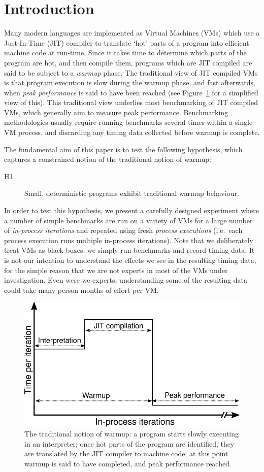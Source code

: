 \documentclass[preprint,numbers,10pt]{sigplanconf}
\newcommand{\hypone}{H1\xspace}
\begin{document}
\section{Introduction}
\label{sec:intro}

Many modern languages are implemented as Virtual Machines (VMs) which use a
Just-In-Time (JIT) compiler to translate `hot' parts of a program into efficient
machine code at run-time. Since it takes time to determine which parts of the
program are hot, and then compile them, programs which are JIT compiled are
said to be subject to a \emph{warmup} phase. The traditional view of
JIT compiled VMs is that program execution is slow during the warmup phase, and
fast afterwards, when \emph{peak performance} is said to have been reached
(see Figure~\ref{fig:trad} for a simplified view of this).
This traditional view underlies most benchmarking of JIT compiled VMs, which
generally aim to measure peak performance.
Benchmarking methodologies usually
require running benchmarks several times within a single VM process, and
discarding any timing data collected before warmup is complete.

The fundamental aim of this paper is to test the following hypothesis, which captures a constrained
notion of the traditional notion of warmup:
\begin{description}
  \item[\hypone] Small, deterministic programs exhibit traditional warmup behaviour.
\end{description}
In order to test this hypothesis, we present a carefully designed
experiment where a number of simple benchmarks are run on a variety of
VMs for a large number of \emph{in-process iterations} and repeated using fresh
\emph{process executions} (i.e.~each process execution runs multiple in-process
iterations). Note that we deliberately treat VMs as black
boxes: we simply run benchmarks and record timing data. It is not our intention
to understand the effects we see in the resulting timing data, for the simple
reason that we are not experts in most of the VMs under investigation. Even were
we experts, understanding some of the resulting data could take many person
months of effort per VM.

\begin{figure}[t]
\centering
\includegraphics[width=.475\textwidth]{img/picturebook_warmup}
\caption{The traditional notion of warmup: a program starts slowly executing in
an interpreter; once hot parts of the program are identified, they are
translated by the JIT compiler to machine code; at this point warmup
is said to have completed, and peak performance reached.}
\label{fig:trad}
\end{figure}
\end{document}
